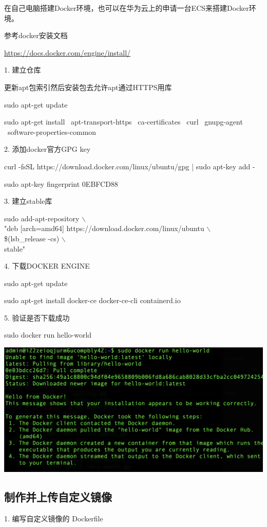 \documentclass[fontset=windows,openany,UTF8]{ctexbook}
\begin{document}
在自己电脑搭建Docker环境，也可以在华为云上的申请一台ECS来搭建Docker环境。

参考docker安装文档

\url{https://docs.docker.com/engine/install/}

1. 建立仓库

更新apt包索引然后安装包去允许apt通过HTTPS用库

sudo apt-get update

sudo apt-get install \
    apt-transport-https \
    ca-certificates \
    curl \
    gnupg-agent \
    software-properties-common

2. 添加docker官方GPG key

curl -fsSL https://download.docker.com/linux/ubuntu/gpg | sudo apt-key add -

sudo apt-key fingerprint 0EBFCD88

3. 建立stable库

sudo add-apt-repository $\backslash$ \\
    "deb [arch=amd64] https://download.docker.com/linux/ubuntu $\backslash$ \\
    \$(lsb\_release -cs) $\backslash$ \\
    stable"

4. 下载DOCKER ENGINE

sudo apt-get update

sudo apt-get install docker-ce docker-ce-cli containerd.io

5. 验证是否下载成功

sudo docker run hello-world

\includegraphics[scale=0.3]{./assets/docker_hw.png}  

\subsection{制作并上传自定义镜像}

1. 编写自定义镜像的 Dockerfile
\end{document}
